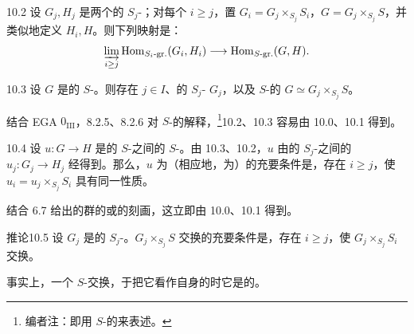 \begin{SGAresult}{}{10.2}
设 $G_j,H_j$ 是两个的 $S_j$-；对每个 $i\geq j$，置 $G_i=G_j\times_{S_j}S_i$，$G=G_j\times_{S_j}S$，并类似地定义 $H_i,H$。则下列映射是：
\[
\varinjlim_{i\geq j}\operatorname{Hom}_{S_i\text{-gr.}}(G_i,H_i)\longrightarrow\operatorname{Hom}_{S\text{-gr.}}(G,H).
\]
\end{SGAresult}
\begin{SGAresult}{}{10.3}
设 $G$ 是的 $S$-。则存在 $j\in I$、的 $S_j$- $G_j$，以及 $S$-的 $G\simeq G_j\times_{S_j}S$。
\end{SGAresult}
结合 EGA $0_{\mathrm{III}}$，8.2.5、8.2.6 对 $S$-的解释，\footnote{编者注：即用 $S$-的来表述。}10.2、10.3 容易由 10.0、10.1 得到。

\begin{SGAresult}{}{10.4}
设 $u:G\to H$ 是的 $S$-之间的 $S$-。由 10.3、10.2，$u$ 由的 $S_j$-之间的 $u_j:G_j\to H_j$ 经得到。那么，$u$ 为（相应地，为）的充要条件是，存在 $i\geq j$，使 $u_i=u_j\times_{S_j}S_i$ 具有同一性质。
\end{SGAresult}
结合 6.7 给出的群的或的刻画，这立即由 10.0、10.1 得到。

\begin{SGAresult}{推论}{10.5}
设 $G_j$ 是的 $S_j$-。$G_j\times_{S_j}S$ 交换的充要条件是，存在 $i\geq j$，使 $G_j\times_{S_j}S_i$ 交换。
\end{SGAresult}
事实上，一个 $S$-交换，于把它看作自身的时它是的。

